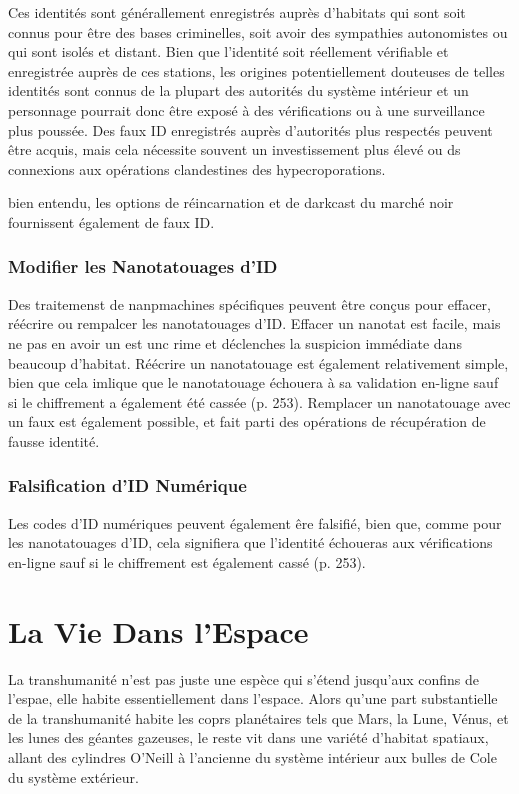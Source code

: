 Ces identités sont générallement enregistrés auprès d'habitats qui sont soit connus pour être des bases criminelles, soit avoir des sympathies autonomistes ou qui sont isolés et distant. Bien que l'identité soit réellement vérifiable et enregistrée auprès de ces stations, les origines potentiellement douteuses de telles identités sont connus de la plupart des autorités du système intérieur et un personnage pourrait donc être exposé à des vérifications ou à une surveillance plus poussée. Des faux ID enregistrés auprès d'autorités plus respectés peuvent être acquis, mais cela nécessite souvent un investissement plus élevé ou ds connexions aux opérations clandestines des hypecroporations. 

bien entendu, les options de réincarnation et de darkcast du marché noir fournissent également de faux ID. 

\subsubsection{Modifier les Nanotatouages d'ID} 

Des traitemenst de nanpmachines spécifiques peuvent être conçus pour effacer, réécrire ou rempalcer les nanotatouages d'ID. Effacer un nanotat est facile, mais ne pas en avoir un est unc rime et déclenches la suspicion immédiate dans beaucoup d'habitat. Réécrire un nanotatouage est également relativement simple, bien que cela imlique que le nanotatouage échouera à sa validation en-ligne sauf si le chiffrement a également été cassée (p. 253). Remplacer un nanotatouage avec un faux est également possible, et fait parti des opérations de récupération de fausse identité. 

\subsubsection{Falsification d'ID Numérique} 

Les codes d'ID numériques peuvent également êre falsifié, bien que, comme pour les nanotatouages d'ID, cela signifiera que l'identité échoueras aux vérifications en-ligne sauf si le chiffrement est également cassé (p. 253). 

\section{La Vie Dans l'Espace} 

La transhumanité n'est pas juste une espèce qui s'étend jusqu'aux confins de l'espae, elle habite essentiellement dans l'espace. Alors qu'une part substantielle de la transhumanité habite les coprs planétaires tels que Mars, la Lune, Vénus, et les lunes des géantes gazeuses, le reste vit dans une variété d'habitat spatiaux, allant des cylindres O'Neill à l'ancienne du système intérieur aux bulles de Cole du système extérieur. 

